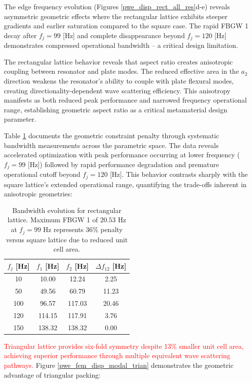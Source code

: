 \documentclass[review,numbers,sort&compress]{elsarticle}
\begin{document}
The edge frequency evolution (Figures \ref{pwe_disp_rect_all_res}d-e) reveals asymmetric geometric effects where the rectangular lattice exhibits steeper gradients and earlier saturation compared to the square case. The rapid FBGW 1 decay after $f_j = 99$ [Hz] and complete disappearance beyond $f_j = 120$ [Hz] demonstrates compressed operational bandwidth – a critical design limitation.

The rectangular lattice behavior reveals that aspect ratio creates anisotropic coupling between resonator and plate modes. The reduced effective area in the $a_2$ direction weakens the resonator's ability to couple with plate flexural modes, creating directionality-dependent wave scattering efficiency. This anisotropy manifests as both reduced peak performance and narrowed frequency operational range, establishing geometric aspect ratio as a critical metamaterial design parameter.

Table \ref{tab_rect_latice_fbgw} documents the geometric constraint penalty through systematic bandwidth measurements across the parametric space. The data reveals accelerated optimization with peak performance occurring at lower frequency ($f_j = 99$ [Hz]) followed by rapid performance degradation and premature operational cutoff beyond $f_j = 120$ [Hz]. This behavior contrasts sharply with the square lattice's extended operational range, quantifying the trade-offs inherent in anisotropic geometries:
\newpage
\begin{table}[htb]
    \centering
    \caption{Bandwidth evolution for rectangular lattice. Maximum FBGW 1 of $20.53$ Hz at $f_j = 99$ Hz represents 36\% penalty versus square lattice due to reduced unit cell area.}
    \label{tab_rect_latice_fbgw}
    \begin{tabular}{cccc}
        \hline
        $f_j$ [Hz] & $f_1$ [Hz] & $f_2$ [Hz] & $\Delta f_{12}$ [Hz] \\
        \hline
        10  & 10.00  & 12.24  & 2.25 \\
        50  & 49.56  & 60.79  & 11.23 \\
        100 & 96.57  & 117.03 & 20.46 \\
        120 & 114.15 & 117.91 & 3.76 \\
        150 & 138.32 & 138.32 & 0.00 \\
        \hline
    \end{tabular}
\end{table}

\textcolor{red}{Triangular lattice provides six-fold symmetry despite 13\% smaller unit cell area, achieving superior performance through multiple equivalent wave scattering pathways.} Figure \ref{pwe_fem_disp_modal_trian} demonstrates the geometric advantage of triangular packing:
\end{document}
